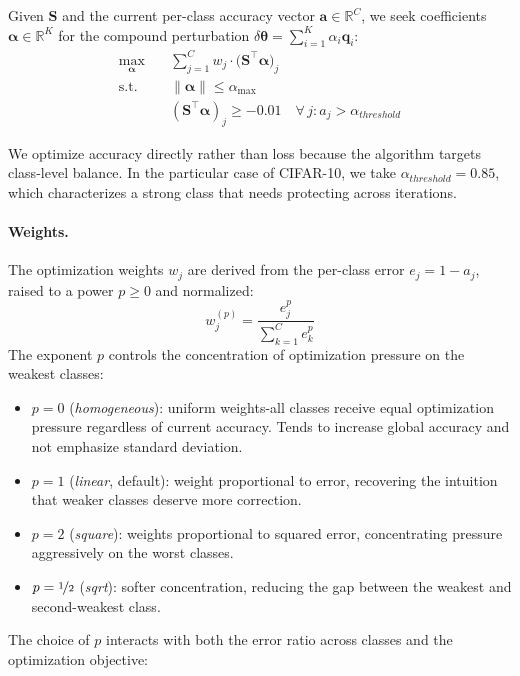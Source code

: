 \documentclass[11pt,a4paper]{article}
\newcommand{\R}{\mathbb{R}}
\newcommand{\norm}[1]{\lVert #1 \rVert}
\newcommand{\mat}[1]{\bm{#1}}
\newcommand{\vect}[1]{\bm{#1}}
\begin{document}
Given $\mat{S}$ and the current per-class accuracy vector
$\vect{a} \in \R^C$, we seek coefficients $\vect{\alpha} \in \R^K$
for the compound perturbation
$\delta\vect{\theta} = \sum_{i=1}^K \alpha_i \vect{q}_i$:
\begin{equation}
\begin{aligned}
\max_{\vect{\alpha}} \quad & \sum_{j=1}^C w_j \cdot
  \bigl(\mat{S}^\top \vect{\alpha}\bigr)_j \\
\text{s.t.} \quad
  & \norm{\vect{\alpha}} \leq \alpha_{\max} \\
  & (\mat{S}^\top \vect{\alpha})_j \geq -0.01 \quad
    \forall\, j : a_j > \alpha_{threshold}
\end{aligned}
\label{eq:optim}
\end{equation}

We optimize accuracy directly rather than loss because the algorithm
targets class-level balance. In the particular case of CIFAR-10, we take $\alpha_{threshold} = 0.85$, which characterizes a strong class that needs protecting across iterations.

\paragraph{Weights.}
The optimization weights $w_j$ are derived from the per-class error
$e_j = 1 - a_j$, raised to a power $p \geq 0$ and normalized:
\begin{equation}
w_j^{(p)} = \frac{e_j^p}{\sum_{k=1}^C e_k^p}
\label{eq:weights}
\end{equation}
The exponent $p$ controls the concentration of optimization pressure
on the weakest classes:
\begin{itemize}
  \item $p = 0$ (\emph{homogeneous}): uniform weights-all classes
    receive equal optimization pressure regardless of current accuracy. Tends to increase global accuracy and not emphasize standard deviation. 
  \item $p = 1$ (\emph{linear}, default): weight proportional to error,
    recovering the intuition that weaker classes deserve more correction.
  \item $p = 2$ (\emph{square}): weights proportional to squared error,
    concentrating pressure aggressively on the worst classes.
  \item $p = \nicefrac{1}{2}$ (\emph{sqrt}): softer concentration,
    reducing the gap between the weakest and second-weakest class.
\end{itemize}
The choice of $p$ interacts with both the error ratio across classes
and the optimization objective:
\end{document}

